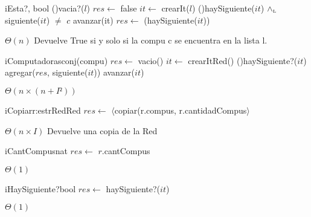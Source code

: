 \begin{Algoritmos}
  \begin{algoritmo}{iEsta?}{, }{bool}
    \eIf(){vacia?($l$)}{
      $res \gets$ false
    }{
     $it \gets$ crearIt($l$)
      \While(){haySiguiente($it$) $\land_{\mathrm{\scriptscriptstyle{L}}}$ siguiente($it$) $\neq$ $c$}{
        avanzar(it)
      }
    }
    $res \gets$ (haySiguiente($it$))
  \end{algoritmo}
  \datosAlgoritmo{} %
  {} %
  {} %
  {$\Theta(n)$} %
  {Devuelve True si y solo si la compu c se encuentra en la lista l.} %

  \begin{algoritmo}{iComputadoras}{}{conj(compu)}{}
    $res \gets$ vacio()
     $it \gets$ crearItRed()
    \While(){haySiguiente?($it$)}{
      agregar($res$, siguiente($it$))
      avanzar($it$)
    }
  \end{algoritmo}
  \datosAlgoritmo{} %
  {} %
  {} %
  {$\Theta(n \times (n+I²))$} %
  {} %
   
   \begin{algoritmo}{iCopiar}{\In r:estrRed}{Red}
   	$res \gets$ $\langle$copiar(r.compus, r.cantidadCompus$\rangle$
   \end{algoritmo}
  \datosAlgoritmo{} %
  {} %
  {} %
  {$\Theta(n \times I)$} %
  {Devuelve una copia de la Red} %

   \begin{algoritmo}{iCantCompus}{}{nat}
    $res \gets$ $r$.cantCompus
   \end{algoritmo}   
  \datosAlgoritmo{} %
  {} %
  {} %
  {$\Theta(1)$} %
  {} %


  \begin{algoritmo}{iHaySiguiente?}{}{bool}{}
  $res \gets$ haySiguiente?($it$)
  \end{algoritmo}
  \datosAlgoritmo{} %
  {} %
  {} %
  {$\Theta(1)$} %
  {} %


\end{Algoritmos}
